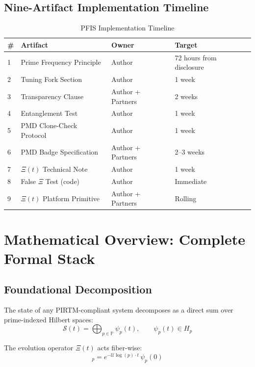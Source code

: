 \documentclass[12pt,letterpaper]{article}
\theoremstyle{definition}
\theoremstyle{remark}
\begin{document}
\subsection{Nine-Artifact Implementation Timeline}

\begin{table}[H]
\centering
\caption{PFIS Implementation Timeline}
\begin{tabular}{llll}
\toprule
\textbf{\#} & \textbf{Artifact} & \textbf{Owner} & \textbf{Target} \\
\midrule
1 & Prime Frequency Principle & Author & 72 hours from disclosure \\
2 & Tuning Fork Section & Author & 1 week \\
3 & Transparency Clause & Author + Partners & 2 weeks \\
4 & Entanglement Test & Author & 1 week \\
5 & PMD Clone-Check Protocol & Author & 1 week \\
6 & PMD Badge Specification & Author + Partners & 2--3 weeks \\
7 & $\Xi(t)$ Technical Note & Author & 1 week \\
8 & False $\Xi$ Test (code) & Author & Immediate \\
9 & $\Xi(t)$ Platform Primitive & Author + Partners & Rolling \\
\bottomrule
\end{tabular}
\end{table}

\section{Mathematical Overview: Complete Formal Stack}

\subsection{Foundational Decomposition}

The state of any PIRTM-compliant system decomposes as a direct sum over prime-indexed Hilbert spaces:
\begin{equation}
\mathcal{S}(t) = \bigoplus_{p \in \mathbb{P}} \psi_p(t), \qquad \psi_p(t) \in H_p
\end{equation}

The evolution operator $\Xi(t)$ acts fiber-wise:
\begin{equation}
[\Xi(t)\mathcal{S}]_p = e^{-\mathcal{U}\log(p)\cdot t}\,\psi_p(0)
\end{equation}
\end{document}
